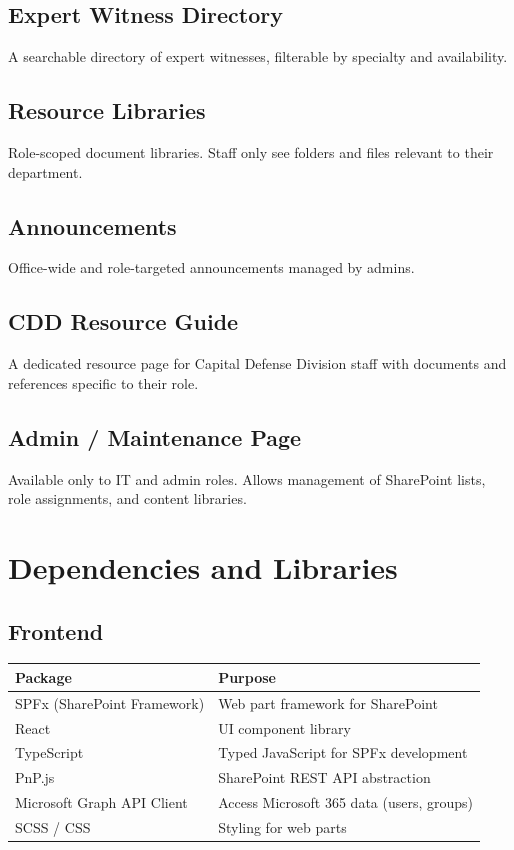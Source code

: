 \documentclass[12pt]{article}
\begin{document}
\subsection{Expert Witness Directory}
A searchable directory of expert witnesses, filterable by specialty and availability.

\subsection{Resource Libraries}
Role-scoped document libraries. Staff only see folders and files relevant to their department.

\subsection{Announcements}
Office-wide and role-targeted announcements managed by admins.

\subsection{CDD Resource Guide}
A dedicated resource page for Capital Defense Division staff with documents and references specific to their role.

\subsection{Admin / Maintenance Page}
Available only to IT and admin roles. Allows management of SharePoint lists, role assignments, and content libraries.

\section{Dependencies and Libraries}

\subsection{Frontend}
\begin{longtable}{|p{2.5in}|p{3.5in}|}
\hline
\textbf{Package} & \textbf{Purpose} \\ \hline
SPFx (SharePoint Framework) & Web part framework for SharePoint \\ \hline
React & UI component library \\ \hline
TypeScript & Typed JavaScript for SPFx development \\ \hline
PnP.js & SharePoint REST API abstraction \\ \hline
Microsoft Graph API Client & Access Microsoft 365 data (users, groups) \\ \hline
SCSS / CSS & Styling for web parts \\ \hline
\end{longtable}
\end{document}
